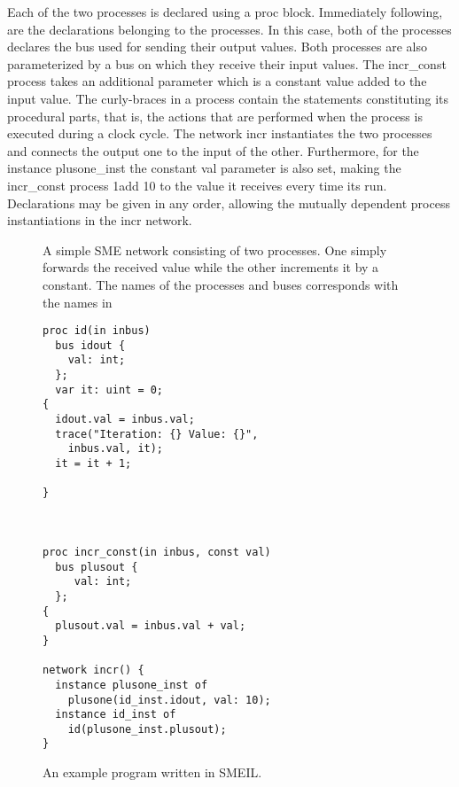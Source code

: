 Each of the two processes is declared using a {\ttfamily proc} block. Immediately
following, are the declarations belonging to the processes. In this case, both
of the processes declares the bus used for sending their output values. Both
processes are also parameterized by a bus on which they receive their input
values. The {\ttfamily incr\_const} process takes an additional parameter which is a
constant value added to the input value. The curly-braces in a process contain
the statements constituting its procedural parts, that is, the actions that are
performed when the process is executed during a clock cycle. The network {\ttfamily
  incr} instantiates the two processes and connects the output one to the input
of the other. Furthermore, for the instance {\ttfamily plusone\_inst} the constant
{\ttfamily val} parameter is also set, making the {\ttfamily incr\_const} process 1add 10 to
the value it receives every time its run. Declarations may be given in any
order, allowing the mutually dependent process instantiations in the {\ttfamily incr}
network.


\begin{figure}
  \centering
    \caption{A simple SME network consisting of two processes. One simply
      forwards the received value while the other increments it by a
      constant. The names of the processes and buses corresponds with the names
      in }
  \label{fig:addone}
\end{figure}

\begin{figure}
  \centering
\begin{multicols}{2}
\begin{lstlisting}[language=smeil]
proc id(in inbus)
  bus idout {
    val: int;
  };
  var it: uint = 0;
{
  idout.val = inbus.val;
  trace("Iteration: {} Value: {}",
    inbus.val, it);
  it = it + 1;

}



proc incr_const(in inbus, const val)
  bus plusout {
     val: int;
  };
{
  plusout.val = inbus.val + val;
}

network incr() {
  instance plusone_inst of
    plusone(id_inst.idout, val: 10);
  instance id_inst of
    id(plusone_inst.plusout);
}
\end{lstlisting}
\end{multicols}
\caption{An example program written in SMEIL.}
\label{fig:addone.sme}
\end{figure}



